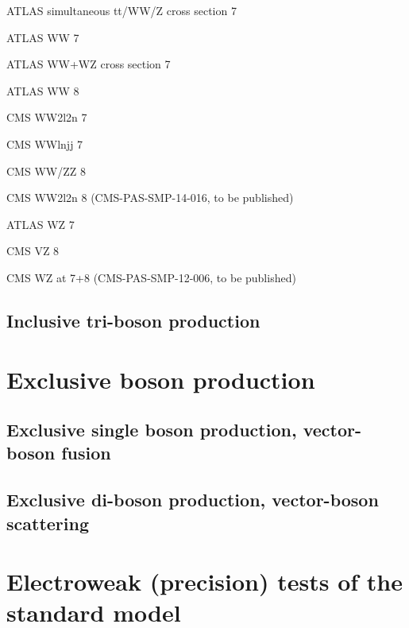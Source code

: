 \documentclass[12pt]{iopart}
\begin{document}
ATLAS simultaneous tt/WW/Z cross section 7 \TeV~\cite{Aad:2014jra}

ATLAS WW 7 \TeV~\cite{ATLAS:2012mec}

ATLAS WW+WZ cross section 7 \TeV~\cite{Aad:2014mda}

ATLAS WW 8 \TeV~\cite{ATLAS-CONF-2014-033}

CMS WW2l2n 7 \TeV~\cite{Chatrchyan:2013yaa}

CMS WWlnjj 7 \TeV~\cite{Chatrchyan:2012bd}

CMS WW/ZZ 8 \TeV~\cite{Chatrchyan:2013oev}

CMS WW2l2n 8 \TeV (CMS-PAS-SMP-14-016, to be published)


ATLAS WZ 7 \TeV~\cite{Aad:2012twa}

CMS VZ 8 \TeV~\cite{Chatrchyan:2014aqa}

CMS WZ at 7+8 \TeV (CMS-PAS-SMP-12-006, to be published)












\subsection{Inclusive tri-boson production}


\section{Exclusive boson production}
\subsection{Exclusive single boson production, vector-boson fusion}


\subsection{Exclusive di-boson production, vector-boson scattering}


\section{Electroweak (precision) tests of the standard model}
\end{document}
